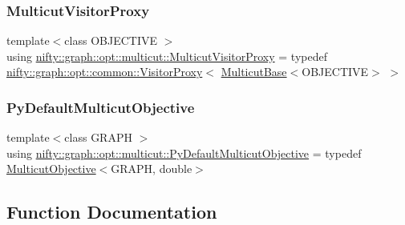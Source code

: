 \subsubsection{\texorpdfstring{Multicut\+Visitor\+Proxy}{MulticutVisitorProxy}}
{\footnotesize\ttfamily template$<$class O\+B\+J\+E\+C\+T\+I\+VE $>$ \\
using \hyperlink{namespacenifty_1_1graph_1_1opt_1_1multicut_aa3ab4d745c71c8cd9ea1535b73f6e54b}{nifty\+::graph\+::opt\+::multicut\+::\+Multicut\+Visitor\+Proxy} = typedef \hyperlink{classnifty_1_1graph_1_1opt_1_1common_1_1VisitorProxy}{nifty\+::graph\+::opt\+::common\+::\+Visitor\+Proxy}$<$ \hyperlink{classnifty_1_1graph_1_1opt_1_1multicut_1_1MulticutBase}{Multicut\+Base}$<$O\+B\+J\+E\+C\+T\+I\+VE$>$ $>$}

\mbox{\label{namespacenifty_1_1graph_1_1opt_1_1multicut_a7dbb5a757325e1a3bdf7e8ed21168986}} 
\subsubsection{\texorpdfstring{Py\+Default\+Multicut\+Objective}{PyDefaultMulticutObjective}}
{\footnotesize\ttfamily template$<$class G\+R\+A\+PH $>$ \\
using \hyperlink{namespacenifty_1_1graph_1_1opt_1_1multicut_a7dbb5a757325e1a3bdf7e8ed21168986}{nifty\+::graph\+::opt\+::multicut\+::\+Py\+Default\+Multicut\+Objective} = typedef \hyperlink{classnifty_1_1graph_1_1opt_1_1multicut_1_1MulticutObjective}{Multicut\+Objective}$<$G\+R\+A\+PH, double$>$}



\subsection{Function Documentation}
\mbox{\label{namespacenifty_1_1graph_1_1opt_1_1multicut_aa76d6b4acd0499b1fb1e18eed88696fb}} 
